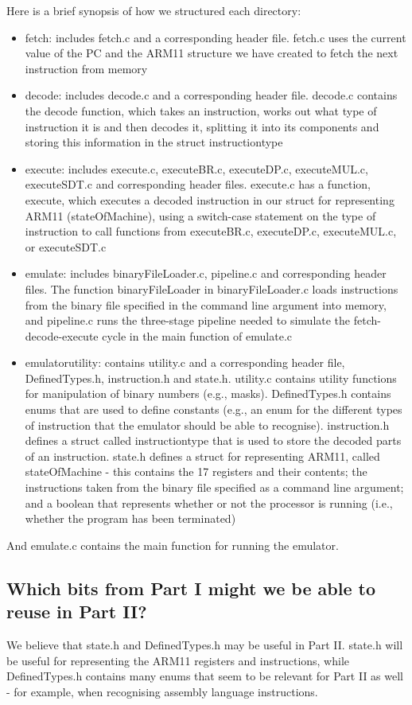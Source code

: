 \documentclass[letterpaper,11pt]{article}
\begin{document}
\noindent Here is a brief synopsis of how we structured each directory:

\begin{itemize}
    \item fetch: includes fetch.c and a corresponding header file. fetch.c uses the current value of the PC and the ARM11 structure we have created to fetch the next instruction from memory
    \item decode: includes decode.c and a corresponding header file. decode.c contains the decode function, which takes an instruction, works out what type of instruction it is and then decodes it, splitting it into its components and storing this information in the struct instructiontype
    \item execute: includes execute.c, executeBR.c, executeDP.c, executeMUL.c, executeSDT.c and corresponding header files. execute.c has a function, execute, which executes a decoded instruction in our struct for representing ARM11 (stateOfMachine), using a switch-case statement on the type of instruction to call functions from executeBR.c, executeDP.c, executeMUL.c, or executeSDT.c
    \item emulate: includes binaryFileLoader.c, pipeline.c and corresponding header files. The function binaryFileLoader in binaryFileLoader.c loads instructions from the binary file specified in the command line argument into memory, and pipeline.c runs the three-stage pipeline needed to simulate the fetch-decode-execute cycle in the main function of emulate.c
    \item emulatorutility: contains utility.c and a corresponding header file, DefinedTypes.h, instruction.h and state.h. utility.c contains utility functions for manipulation of binary numbers (e.g., masks). DefinedTypes.h contains enums that are used to define constants (e.g., an enum for the different types of instruction that the emulator should be able to recognise). instruction.h defines a struct called instructiontype that is used to store the decoded parts of an instruction. state.h defines a struct for representing ARM11, called stateOfMachine - this contains the 17 registers and their contents; the instructions taken from the binary file specified as a command line argument; and a boolean that represents whether or not the processor is running (i.e., whether the program has been terminated)
\end{itemize}
And emulate.c contains the main function for running the emulator.

\subsection{Which bits from Part I might we be able to reuse in Part II?}
We believe that state.h and DefinedTypes.h may be useful in Part II. state.h will be useful for representing the ARM11 registers and instructions, while DefinedTypes.h contains many enums that seem to be relevant for Part II as well - for example, when recognising assembly language instructions.
\end{document}
